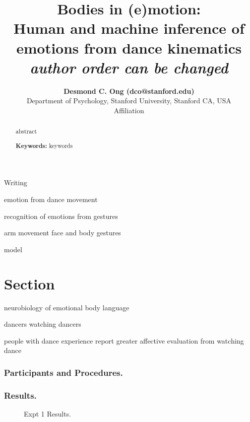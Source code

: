 \documentclass[10pt,letterpaper]{article}
\title{ Bodies in (e)motion: \\ Human and machine inference of emotions from dance kinematics \\ \textit{author order can be changed} }
\author{{\large \bf Desmond C. Ong (dco@stanford.edu)} \\
  Department of Psychology, Stanford University, Stanford CA, USA 
  \And {\large \bf Carolyn Fu (...)} \\
  Affiliation
}
\begin{document}
\maketitle

\begin{abstract}
abstract

\textbf{Keywords:} 
keywords
\end{abstract}

Writing





emotion from dance movement \cite{Camurri2003, Camurri2004}

recognition of emotions from gestures \cite{Atkinson2007}

arm movement \cite{Pollick2001}
face and body gestures \cite{Gunes2007}

model \cite{Schindler2008, Shikanai2013}

\section{Section}

neurobiology of emotional body language \cite{deGelder2006} 

dancers watching dancers \cite{Cross2006}

people with dance experience report greater affective evaluation from watching dance \cite{Kirsch2013}

\subsubsection{Participants and Procedures.} 

\subsubsection{Results.} 

\begin{figure}[htb!]
\caption{ Expt 1 Results. }
\label{Expt1ResultFig}
\end{figure}



\begin{table}
\caption{Predictions for Experiment 2. }
\label{Expt2Predictions}
\end{table}
\end{document}
